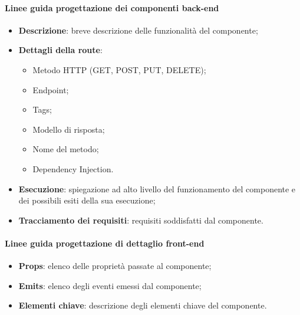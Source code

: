 \paragraph*{Linee guida progettazione dei componenti back-end}
\begin{itemize}
  \item \textbf{Descrizione}: breve descrizione delle funzionalità del componente;
  \item \textbf{Dettagli della route}:
  \begin{itemize}
    \item Metodo HTTP (GET, POST, PUT, DELETE);
    \item Endpoint;
    \item Tags;
    \item Modello di risposta;
    \item Nome del metodo;
    \item Dependency Injection.
  \end{itemize}
  \item \textbf{Esecuzione}: spiegazione ad alto livello del funzionamento del componente e dei possibili esiti della sua esecuzione; 
  \item \textbf{Tracciamento dei requisiti}: requisiti soddisfatti dal componente.
\end{itemize}

\paragraph*{Linee guida progettazione di dettaglio front-end}
\begin{itemize}
  \item \textbf{Props}: elenco delle proprietà passate al componente;
  \item \textbf{Emits}: elenco degli eventi emessi dal componente;
  \item \textbf{Elementi chiave}: descrizione degli elementi chiave del componente. 
\end{itemize}

